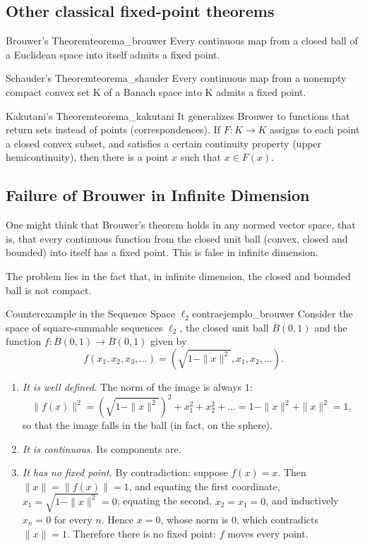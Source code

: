 \documentclass[11pt, a4paper]{article}
\begin{document}
\subsection{Other classical fixed-point theorems}

\begin{teorema}{Brouwer's Theorem}{teorema_brouwer}
Every continuous map from a closed ball of a Euclidean space into itself admits a fixed
point.
\end{teorema}

\begin{teorema}{Schauder's Theorem}{teorema_shauder}
Every continuous map from a nonempty compact convex set K of a Banach space into K admits a
fixed point.
\end{teorema}

\begin{teorema}{Kakutani's Theorem}{teorema_kakutani}
It generalizes Brouwer to functions that return sets instead of points (correspondences).
If $F: K \to K$ assigns to each point a closed convex subset, and satisfies a certain
continuity property (upper hemicontinuity), then there is a point $x$ such that $x \in F(x)$.
\end{teorema}

\subsection{Failure of Brouwer in Infinite Dimension}

One might think that Brouwer's theorem holds in any normed vector space, that is,
that every continuous function from the closed unit ball (convex, closed and bounded) into itself has a
fixed point. This is false in infinite dimension.

The problem lies in the fact that, in infinite dimension, the closed and bounded ball is not compact.

\begin{ejemplo}{Counterexample in the Sequence Space $\ell_2$}{contraejemplo_brouwer}
Consider the space of square-summable sequences $\ell_2$, the closed unit ball
$\overline{B}(0, 1)$ and the function $f: \overline{B}(0, 1) \to \overline{B}(0, 1)$ given by
$$ f(x_1, x_2, x_3, \dots) = \left( \sqrt{1 - \|x\|^2}, x_1, x_2, \dots \right). $$
\begin{enumerate}
    \item \textit{It is well defined.} The norm of the image is always $1$:
    $$ \|f(x)\|^2 = (\sqrt{1 - \|x\|^2})^2 + x_1^2 + x_2^2 + \dots = 1 - \|x\|^2 + \|x\|^2 = 1, $$
    so that the image falls in the ball (in fact, on the sphere).
    \item \textit{It is continuous.} Its components are.
    \item \textit{It has no fixed point.} By contradiction: suppose $f(x) = x$. Then
    $\|x\| = \|f(x)\| = 1$, and
    equating the first coordinate, $x_1 = \sqrt{1 - \|x\|^2} = 0$; equating the second,
    $x_2 = x_1 = 0$, and inductively $x_n = 0$ for every $n$. Hence $x = 0$, whose norm is $0$, which
    contradicts $\|x\| = 1$. Therefore there is no fixed point: $f$ moves every point.
\end{enumerate}
\end{ejemplo}
\end{document}
